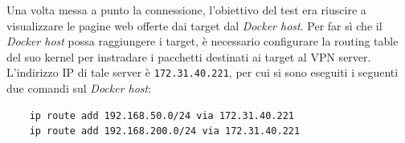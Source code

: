 










Una volta messa a punto la connessione, l'obiettivo del test era riuscire a visualizzare
le pagine web offerte dai target dal \textit{Docker host}.
Per far sì che il \textit{Docker host} possa raggiungere i target, è necessario
configurare la routing table del suo kernel per instradare i pacchetti destinati
ai target al VPN server. L'indirizzo IP di tale server è \texttt{172.31.40.221},
per cui si sono eseguiti i seguenti due comandi sul \textit{Docker host}:
\begin{verbatim}
	ip route add 192.168.50.0/24 via 172.31.40.221
	ip route add 192.168.200.0/24 via 172.31.40.221
\end{verbatim}

